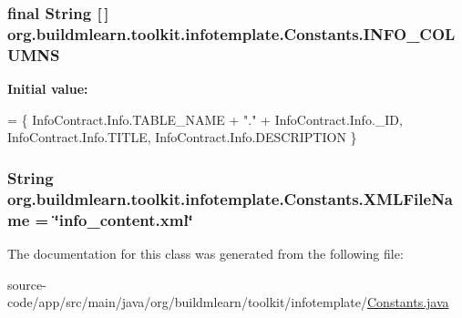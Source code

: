 \subsubsection[{\texorpdfstring{I\+N\+F\+O\+\_\+\+C\+O\+L\+U\+M\+NS}{INFO_COLUMNS}}]{\setlength{\rightskip}{0pt plus 5cm}final String \mbox{[}$\,$\mbox{]} org.\+buildmlearn.\+toolkit.\+infotemplate.\+Constants.\+I\+N\+F\+O\+\_\+\+C\+O\+L\+U\+M\+NS\hspace{0.3cm}{\ttfamily [static]}}\hypertarget{classorg_1_1buildmlearn_1_1toolkit_1_1infotemplate_1_1Constants_ae6b2c8cbf31d03d1b293d88c4b9ac24d}{}\label{classorg_1_1buildmlearn_1_1toolkit_1_1infotemplate_1_1Constants_ae6b2c8cbf31d03d1b293d88c4b9ac24d}
{\bfseries Initial value\+:}
\begin{DoxyCode}
= \{
            InfoContract.Info.TABLE\_NAME + \textcolor{stringliteral}{"."} + InfoContract.Info.\_ID,
            InfoContract.Info.TITLE,
            InfoContract.Info.DESCRIPTION
    \}
\end{DoxyCode}
\subsubsection[{\texorpdfstring{X\+M\+L\+File\+Name}{XMLFileName}}]{\setlength{\rightskip}{0pt plus 5cm}String org.\+buildmlearn.\+toolkit.\+infotemplate.\+Constants.\+X\+M\+L\+File\+Name = \char`\"{}info\+\_\+content.\+xml\char`\"{}\hspace{0.3cm}{\ttfamily [static]}}\hypertarget{classorg_1_1buildmlearn_1_1toolkit_1_1infotemplate_1_1Constants_a6e52222033a5037d1a0150911ad0d793}{}\label{classorg_1_1buildmlearn_1_1toolkit_1_1infotemplate_1_1Constants_a6e52222033a5037d1a0150911ad0d793}


The documentation for this class was generated from the following file\+:\begin{DoxyCompactItemize}
\item 
source-\/code/app/src/main/java/org/buildmlearn/toolkit/infotemplate/\hyperlink{infotemplate_2Constants_8java}{Constants.\+java}\end{DoxyCompactItemize}
